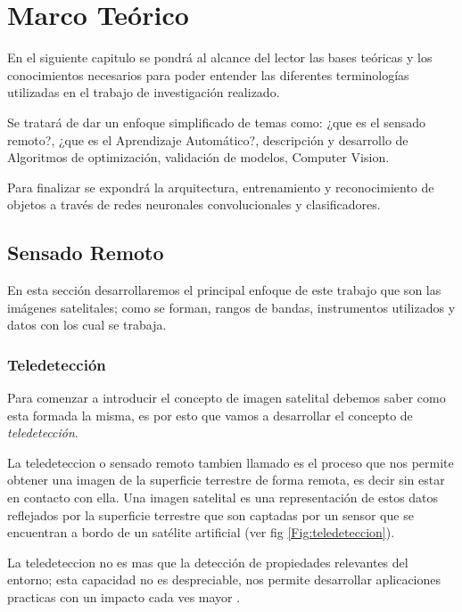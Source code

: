 \chapter{Marco Teórico} \label{chap:marcoteorico}

En el siguiente capitulo se pondrá al alcance del lector las bases teóricas y los conocimientos necesarios para poder entender las diferentes terminologías utilizadas en el trabajo de investigación realizado.

Se tratará de dar un enfoque simplificado de temas como: ¿que es el sensado remoto?, ¿que es el Aprendizaje Automático?, descripción y desarrollo de Algoritmos de optimización, validación de modelos, Computer Vision.

Para finalizar se expondrá la arquitectura, entrenamiento y reconocimiento de objetos a través de  redes neuronales convolucionales y clasificadores.

\section{Sensado Remoto}\label{sec:sensadoremoto}

En esta sección desarrollaremos el principal enfoque de este trabajo que son las imágenes satelitales; como se forman, rangos de bandas, instrumentos utilizados y datos con los cual se trabaja.

\subsection{Teledetección}\label{sub:teledeteccion}

Para comenzar a introducir el concepto de imagen satelital debemos saber como esta formada la misma, es por esto que vamos a desarrollar el concepto de \textit{teledetección}.

La teledeteccion o sensado remoto tambien llamado es el proceso que nos permite obtener una imagen de la superficie terrestre de forma remota, es decir sin estar en contacto con ella. Una imagen satelital es una representación de estos datos reflejados por la superficie terrestre que son captadas por un sensor que se encuentran a bordo de un satélite artificial (ver fig \ref{Fig:teledeteccion}).

La teledeteccion no es mas que la detección de propiedades relevantes del entorno; esta capacidad no es despreciable, nos permite desarrollar aplicaciones practicas con un impacto cada ves mayor \citep{percepcion}. 

